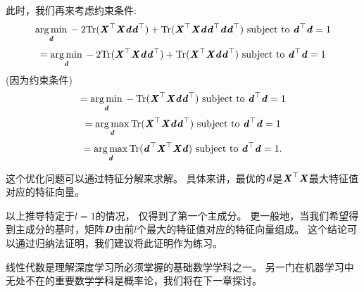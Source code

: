 
此时，我们再来考虑约束条件:
\begin{equation}
    \underset{\Vd}{\arg\min} \, - 2\Tr(\MX^\top\MX \Vd\Vd^\top) + \Tr(\MX^\top\MX\Vd\Vd^\top\Vd\Vd^\top )
    \text{ subject to } \Vd^\top \Vd = 1
\end{equation}
\begin{equation}
    = \underset{\Vd}{\arg\min} \, - 2\Tr(\MX^\top\MX \Vd \Vd^\top) + \Tr(\MX^\top\MX\Vd\Vd^\top )
    \text{ subject to } \Vd^\top \Vd = 1
\end{equation}
 (因为约束条件)
 \begin{equation}
     = \underset{\Vd}{\arg\min} \, - \Tr(\MX^\top\MX \Vd\Vd^\top)
     \text{ subject to } \Vd^\top \Vd = 1
 \end{equation}
 \begin{equation}
     = \underset{\Vd}{\arg\max} \, \Tr(\MX^\top\MX \Vd\Vd^\top)
     \text{ subject to } \Vd^\top \Vd = 1
 \end{equation}
 \begin{equation}
     = \underset{\Vd}{\arg\max} \, \Tr(\Vd^\top\MX^\top\MX \Vd)
     \text{ subject to } \Vd^\top \Vd = 1 .
 \end{equation}


这个优化问题可以通过特征分解来求解。
具体来讲，最优的$\Vd$是$\MX^\top\MX$最大特征值对应的特征向量。


以上推导特定于$l=1$的情况， 仅得到了第一个主成分。
更一般地，当我们希望得到主成分的基时，矩阵$\MD$由前$l$个最大的特征值对应的特征向量组成。
这个结论可以通过归纳法证明，我们建议将此证明作为练习。


线性代数是理解深度学习所必须掌握的基础数学学科之一。
另一门在机器学习中无处不在的重要数学学科是概率论，我们将在下一章探讨。



